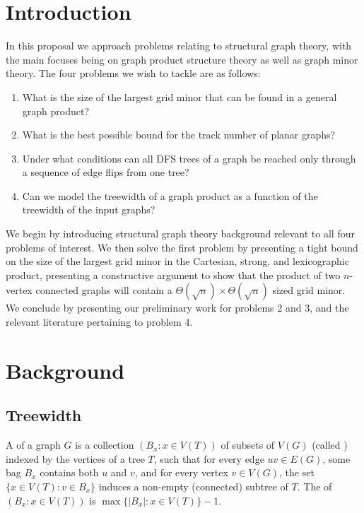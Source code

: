 \documentclass[../main.tex]{subfiles}
\begin{document}
\section{Introduction}
In this proposal we approach problems relating to structural graph theory, with the main focuses being on graph product structure theory as well as graph minor theory. The four problems we wish to tackle are as follows:
\begin{enumerate}
	\item What is the size of the largest grid minor that can be found in a general graph product?
	\item What is the best possible bound for the track number of planar graphs?
	\item Under what conditions can all DFS trees of a graph be reached only through a sequence of edge flips from one tree?
	\item Can we model the treewidth of a graph product as a function of the treewidth of the input graphs?
\end{enumerate}
We begin by introducing structural graph theory background relevant to all four problems of interest. We then solve the first problem by presenting a tight bound on the size of the largest grid minor in the Cartesian, strong, and lexicographic product, presenting a constructive argument to show that the product of two $n$-vertex connected graphs will contain a $\Theta(\sqrt{n})\times\Theta(\sqrt{n})$ sized grid minor. We conclude by presenting our preliminary work for problems 2 and 3, and the relevant literature pertaining to problem 4.

\section{Background}

\subsection{Treewidth}
A  of a graph $G$ is a collection $(B_x :x\in V(T))$ of subsets of $V(G)$ (called ) indexed by the vertices of a tree $T$, such that for every edge $uv\in E(G)$, some bag $B_x$ contains both $u$ and $v$, and for every vertex $v\in V(G)$, the set $\{x\in V(T):v\in B_x\}$ induces a non-empty (connected) subtree of $T$. The  of $(B_x:x\in V(T))$ is $\max\{|B_x| \colon x\in V(T)\}-1$. 
\end{document}

